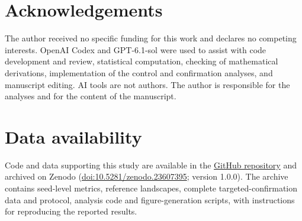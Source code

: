 \section*{Acknowledgements}
The author received no specific funding for this work and declares no competing interests. OpenAI Codex and GPT-6.1-sol were used to assist with code development and review, statistical computation, checking of mathematical derivations, implementation of the control and confirmation analyses, and manuscript editing. AI tools are not authors. The author is responsible for the analyses and for the content of the manuscript.

\section*{Data availability}
Code and data supporting this study are available in the \href{https://github.com/vicenzoscavino1999/qaoa-zne-decision-regret}{GitHub repository} and archived on Zenodo (\href{https://doi.org/10.5281/zenodo.23607395}{doi:10.5281/zenodo.23607395}; version 1.0.0). The archive contains seed-level metrics, reference landscapes, complete targeted-confirmation data and protocol, analysis code and figure-generation scripts, with instructions for reproducing the reported results.
